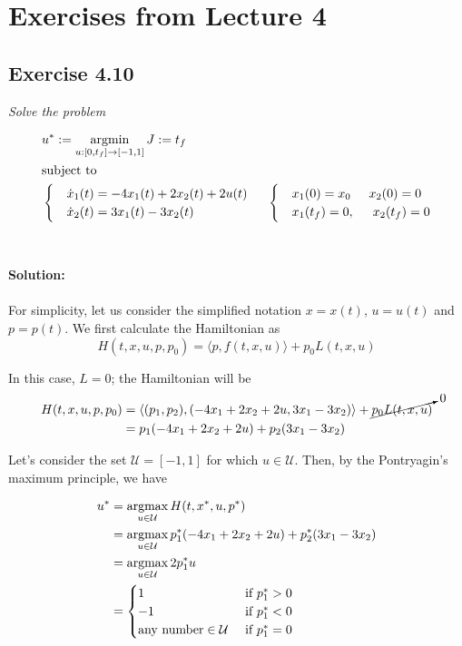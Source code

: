 \section{Exercises from Lecture 4}

\subsection{Exercise 4.10}
\emph{Solve the problem}

\begin{align}
    &u^* := \operatorname*{argmin}_{u:[0,t_f] \to [-1, 1]} J := t_f \\
    &\text{subject to} \\
    &\begin{cases}
        &\Dot{x}_1(t) = -4 x_1(t) + 2x_2(t) + 2u(t)\\
        &\Dot{x}_2(t) = 3x_1(t) -3x_2(t)
    \end{cases}
    \hspace{0.5cm}
    \begin{cases}
        &x_1(0) = x_0 \hspace{0.5cm} x_2(0) = 0 \\
        &x_1(t_f) = 0, \hspace{0.5cm} x_2(t_f) = 0
    \end{cases}
\end{align}
\\
\\
\textbf{Solution:}\\
\\
For simplicity, let us consider the simplified notation $x = x(t)$, $u = u(t)$ and $p = p(t)$. We first calculate the Hamiltonian as
\begin{equation}
\label{eq:hamiltonian}
    H(t, x, u, p, p_0) = \langle p, f(t, x, u) \rangle + p_0L(t, x, u)
\end{equation}

 In this case, $L=0$; the Hamiltonian will be
\begin{align}
    H(t, x, u, p, p_0) &= \langle (p_1, p_2), (-4x_1 + 2x_2 + 2u, 3x_1 -3x_2) \rangle + \cancelto{0}{p_0 L(t, x, u)} \\
    &= p_1(-4x_1 + 2x_2 + 2u) + p_2(3x_1 -3x_2)
\end{align}

Let's consider the set $\mathcal{U} = [-1, 1]$ for which $u \in \mathcal{U}$. Then, by the Pontryagin's maximum principle, we have

\begin{align}
    u^* &= \operatorname*{argmax}_{u \in \mathcal{U}} H(t, x^*, u, p^*)\\
    &=  \operatorname*{argmax}_{u \in \mathcal{U}} p_1^*(-4x_1 + 2x_2 + 2u) + p_2^*(3x_1 -3x_2) \\
    &=  \operatorname*{argmax}_{u \in \mathcal{U}} 2p_1^* u \\
    &= \begin{cases}
        1 &\text{ if } p_1^* > 0 \\
        -1 &\text{ if } p_1^* < 0 \\
        \text{any number} \in \mathcal{U} &\text{ if } p_1^* = 0 \\
    \end{cases} 
\end{align}

